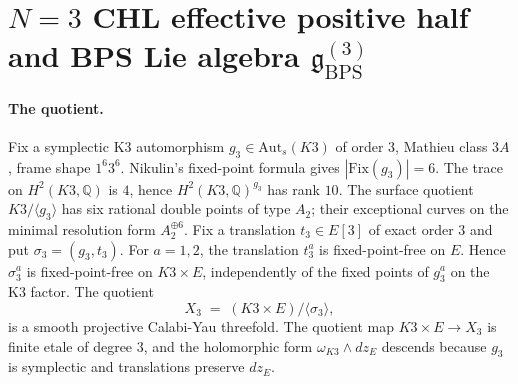 \providecommand{\bC}{\mathbb{C}}
\providecommand{\bZ}{\mathbb{Z}}
\providecommand{\bQ}{\mathbb{Q}}
\providecommand{\bH}{\mathbb{H}}
\providecommand{\cO}{\mathcal{O}}
\providecommand{\cM}{\mathcal{M}}
\providecommand{\Aut}{\mathrm{Aut}}
\providecommand{\Auts}{\mathrm{Aut}_s}
\providecommand{\Sp}{\mathrm{Sp}}
\providecommand{\Fix}{\mathrm{Fix}}
\providecommand{\Coh}{\mathrm{Coh}}
\providecommand{\CoHA}{\mathrm{CoHA}}
\providecommand{\Hilb}{\mathrm{Hilb}}
\providecommand{\DT}{\mathrm{DT}}
\providecommand{\DTred}{Z^{\mathrm{red}}_{\mathrm{DT}}}
\providecommand{\BPS}{\mathrm{BPS}}
\providecommand{\red}{\mathrm{red}}
\providecommand{\eff}{\mathrm{eff}}
\providecommand{\ch}{\mathrm{ch}}
\providecommand{\BKM}{\mathrm{BKM}}
\providecommand{\cat}{\mathrm{cat}}
\providecommand{\fib}{\mathrm{fiber}}
\providecommand{\kch}{\kappa_{\ch}}
\providecommand{\kBKM}{\kappa_{\BKM}}
\providecommand{\kcat}{\kappa_{\cat}}
\providecommand{\kfib}{\kappa_{\fib}}
\providecommand{\Yp}{Y^{+}}
\providecommand{\fg}{\mathfrak{g}}
\providecommand{\GL}{\mathrm{GrLift}}
\providecommand{\DeltaCHLThree}{\Delta_{3}^{(3)}}
\providecommand{\DeltaDDThree}{\Delta_{1}^{(3)}}
\providecommand{\NablaThree}{\nabla_{2}}

\section*{$N=3$ CHL effective positive half and BPS Lie algebra
$\fg^{(3)}_{\BPS}$}
\label{sec:N3-positive-half-BPS}

\paragraph{The quotient.} Fix a symplectic K3 automorphism
$g_3\in\Auts(K3)$ of order $3$, Mathieu class $3A$, frame shape
$1^6 3^6$. Nikulin's fixed-point formula gives
$|\Fix(g_3)|=6$. The trace on $H^2(K3,\bQ)$ is $4$, hence
$H^2(K3,\bQ)^{g_3}$ has rank $10$. The surface quotient
$K3/\langle g_3\rangle$ has six rational double points of type $A_2$;
their exceptional curves on the minimal resolution form
$A_2^{\oplus 6}$. Fix a translation $t_3\in E[3]$ of exact order $3$ and put
$\sigma_3=(g_3,t_3)$. For $a=1,2$, the translation $t_3^a$ is
fixed-point-free on $E$. Hence $\sigma_3^a$ is fixed-point-free on
$K3\times E$,
independently of the fixed points of $g_3^a$ on the K3 factor. The
quotient
\[
  X_3 \;=\; (K3 \times E)\big/\langle\sigma_3\rangle,
\]
is a smooth projective Calabi-Yau threefold. The quotient map
$K3\times E\to X_3$ is finite etale of degree $3$, and the holomorphic
form $\omega_{K3}\wedge dz_E$ descends because $g_3$ is symplectic and
translations preserve $dz_E$.

